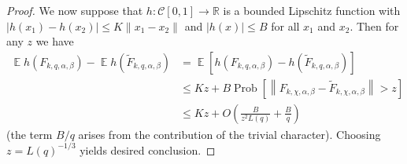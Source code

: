 \documentclass[10pt,a4paper]{amsart}
\newcommand{\Cnorm}[1]{\left\|#1\right\|}
\DeclareMathOperator{\E}{\mathbb{E}}
\newcommand{\R}{\ensuremath{\mathbb{R}}}
\newcommand{\abs}[1]{\left|#1\right|}
\DeclareMathOperator{\prob}{Prob}
\begin{document}
\begin{proof}
    We now suppose that $h:\mathscr C[0,1] \rightarrow \R$ is a bounded Lipschitz function with \linebreak
    $\abs{h(x_1) - h(x_2)} \le K\|x_1 - x_2\|$ and $|h(x)| \le B$ for all $x_1$ and
    $x_2$. Then for any $z$ we have
    \[
    \begin{split}
        \E h(F_{k,q,\alpha,\beta}) - \E h(\tilde F_{k,q,\alpha,\beta}) &= 
        \E \left[h(F_{k, q,\alpha,\beta}) - h(\tilde F_{k, q,\alpha,\beta})\right] \\
        &\le
        Kz + B\prob\left[\Cnorm{F_{k, \chi,\alpha,\beta} - \tilde F_{k, \chi,\alpha,\beta}} > z\right] \\
        &\le Kz + O\left(\frac{B}{z^2 L(q)} + \frac{B}{q}\right)
    \end{split}
    \]
    (the term $B/q$ arises from the contribution of the trivial character).
    Choosing $z = L(q)^{-1/3}$ yields desired conclusion.


\end{proof}
\end{document}
